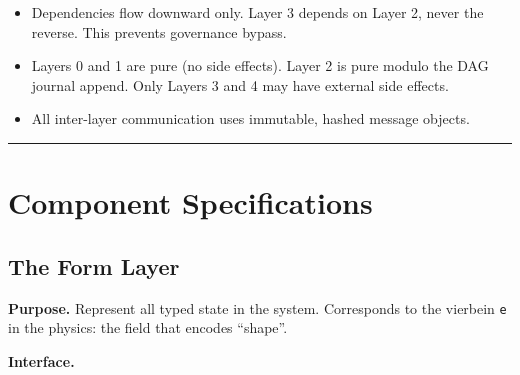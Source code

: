 \documentclass[11pt,a4paper]{article}
\providecommand{\tightlist}{\setlength{\itemsep}{0pt}\setlength{\parskip}{0pt}}
\begin{document}
\begin{itemize}
\tightlist
\item
  Dependencies flow downward only. Layer 3 depends on Layer 2, never the
  reverse. This prevents governance bypass.
\item
  Layers 0 and 1 are pure (no side effects). Layer 2 is pure modulo the
  DAG journal append. Only Layers 3 and 4 may have external side
  effects.
\item
  All inter-layer communication uses immutable, hashed message objects.
\end{itemize}

\begin{center}\rule{0.5\linewidth}{0.5pt}\end{center}

\hypertarget{component-specifications}{%
\section{Component Specifications}\label{component-specifications}}

\hypertarget{the-form-layer}{%
\subsection{The Form Layer}\label{the-form-layer}}

\textbf{Purpose.} Represent all typed state in the system. Corresponds
to the vierbein \texttt{e} in the physics: the field that encodes
``shape''.

\textbf{Interface.}
\end{document}

